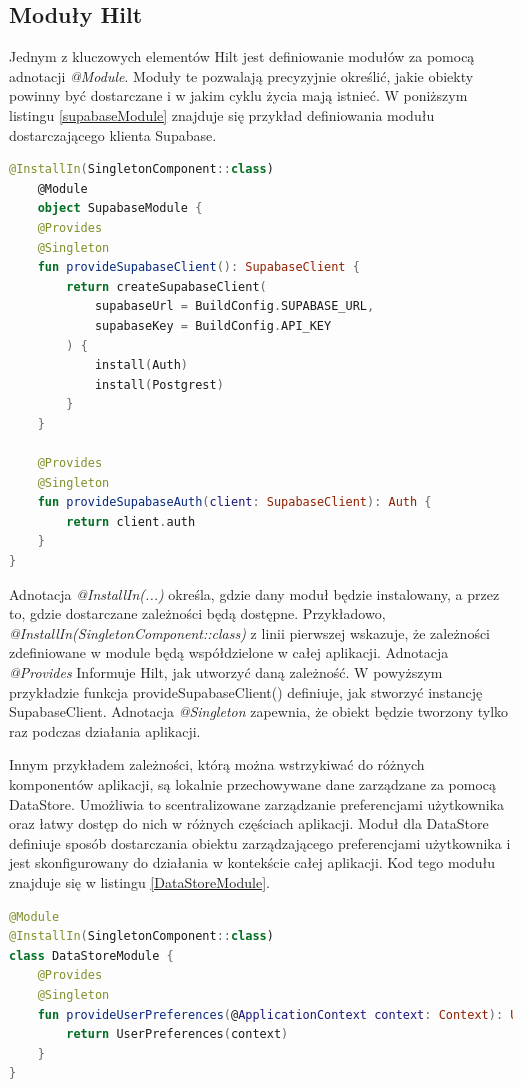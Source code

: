 \documentclass[12pt,twoside]{article}
\begin{document}
\subsection{Moduły Hilt}

Jednym z kluczowych elementów Hilt jest definiowanie modułów za pomocą adnotacji \textit{@Module}. Moduły te pozwalają 
precyzyjnie określić, jakie obiekty powinny być dostarczane i w jakim cyklu życia mają istnieć. W poniższym listingu
\ref{supabaseModule} znajduje się przykład definiowania modułu dostarczającego klienta Supabase.
\begin{lstlisting}[language=Kotlin,caption=Przykład modułu klienta Supabase, label={supabaseModule}]
	@InstallIn(SingletonComponent::class)
	@Module
	object SupabaseModule {
    @Provides
    @Singleton
    fun provideSupabaseClient(): SupabaseClient {
        return createSupabaseClient(
            supabaseUrl = BuildConfig.SUPABASE_URL,
            supabaseKey = BuildConfig.API_KEY
        ) {
            install(Auth)
            install(Postgrest)
        }
    }

    @Provides
    @Singleton
    fun provideSupabaseAuth(client: SupabaseClient): Auth {
        return client.auth
    }
}
\end{lstlisting}
Adnotacja \textit{@InstallIn(...)} określa, gdzie dany moduł będzie instalowany, a przez to, gdzie dostarczane zależności 
będą dostępne. Przykładowo, \textit{@InstallIn(SingletonComponent::class)} z linii pierwszej wskazuje, że zależności 
zdefiniowane w module będą współdzielone w całej aplikacji. Adnotacja \textit{@Provides}
Informuje Hilt, jak utworzyć daną zależność. W powyższym przykładzie funkcja provideSupabaseClient() definiuje, jak 
stworzyć instancję SupabaseClient. Adnotacja \textit{@Singleton} zapewnia, że obiekt będzie tworzony tylko raz podczas działania 
aplikacji.

Innym przykładem zależności, którą można wstrzykiwać do różnych komponentów aplikacji, są lokalnie przechowywane 
dane zarządzane za pomocą DataStore. Umożliwia to scentralizowane zarządzanie preferencjami użytkownika oraz łatwy 
dostęp do nich w różnych częściach aplikacji. Moduł dla DataStore definiuje sposób dostarczania obiektu zarządzającego 
preferencjami użytkownika i jest skonfigurowany do działania w kontekście całej aplikacji. Kod tego modułu znajduje 
się w listingu \ref{DataStoreModule}.

\begin{lstlisting}[language=Kotlin,caption=Przykład modułu DataStore, label={DataStoreModule}]
@Module
@InstallIn(SingletonComponent::class)
class DataStoreModule {
    @Provides
    @Singleton
    fun provideUserPreferences(@ApplicationContext context: Context): UserPreferences {
        return UserPreferences(context)
    }
}
\end{lstlisting}
\end{document}
